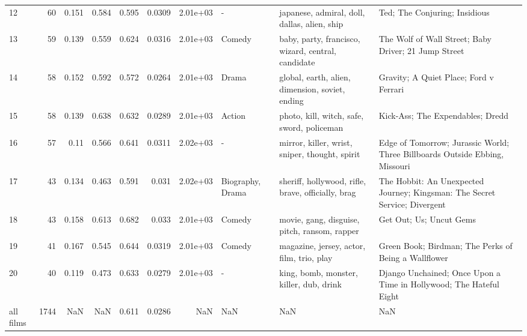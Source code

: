 \begin{tabular}{lrrrrrrlll}
12 & 60 & 0.151 & 0.584 & 0.595 & 0.0309 & 2.01e+03 & - & japanese, admiral, doll, dallas, alien, ship & Ted; The Conjuring; Insidious \\
13 & 59 & 0.139 & 0.559 & 0.624 & 0.0316 & 2.01e+03 & Comedy & baby, party, francisco, wizard, central, candidate & The Wolf of Wall Street; Baby Driver; 21 Jump Street \\
14 & 58 & 0.152 & 0.592 & 0.572 & 0.0264 & 2.01e+03 & Drama & global, earth, alien, dimension, soviet, ending & Gravity; A Quiet Place; Ford v Ferrari \\
15 & 58 & 0.139 & 0.638 & 0.632 & 0.0289 & 2.01e+03 & Action & photo, kill, witch, safe, sword, policeman & Kick-Ass; The Expendables; Dredd \\
16 & 57 & 0.11 & 0.566 & 0.641 & 0.0311 & 2.02e+03 & - & mirror, killer, wrist, sniper, thought, spirit & Edge of Tomorrow; Jurassic World; Three Billboards Outside Ebbing, Missouri \\
17 & 43 & 0.134 & 0.463 & 0.591 & 0.031 & 2.02e+03 & Biography, Drama & sheriff, hollywood, rifle, brave, officially, brag & The Hobbit: An Unexpected Journey; Kingsman: The Secret Service; Divergent \\
18 & 43 & 0.158 & 0.613 & 0.682 & 0.033 & 2.01e+03 & Comedy & movie, gang, disguise, pitch, ransom, rapper & Get Out; Us; Uncut Gems \\
19 & 41 & 0.167 & 0.545 & 0.644 & 0.0319 & 2.01e+03 & Comedy & magazine, jersey, actor, film, trio, play & Green Book; Birdman; The Perks of Being a Wallflower \\
20 & 40 & 0.119 & 0.473 & 0.633 & 0.0279 & 2.01e+03 & - & king, bomb, monster, killer, dub, drink & Django Unchained; Once Upon a Time in Hollywood; The Hateful Eight \\
all films & 1744 & NaN & NaN & 0.611 & 0.0286 & NaN & NaN & NaN & NaN \\
\bottomrule
\end{tabular}
